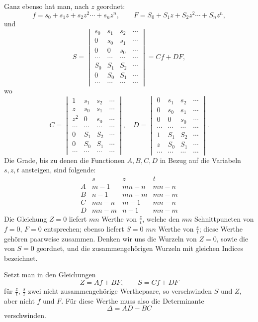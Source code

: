 \documentclass[10pt]{article}
\begin{document}
Ganz ebenso hat man, nach $z$ geordnet:
\[
f=s_0+s_1z+s_2z^2\cdots+s_nz^n,
\qquad
F=S_0+S_1z+S_2z^2\cdots+S_nz^n,
\]
und
\[
S=\begin{vmatrix}
s_0&s_1&s_2&\cdots\\
0&s_0&s_1&\cdots\\
0&0&s_0&\cdots\\
\cdots&\cdots&\cdots&\cdots\\
S_0&S_1&S_2&\cdots\\
0&S_0&S_1&\cdots\\
\cdots&\cdots&\cdots&\cdots
\end{vmatrix}=Cf+DF,
\]
wo
\[
C=\begin{vmatrix}
1&s_1&s_2&\cdots\\
z&s_0&s_1&\cdots\\
z^2&0&s_0&\cdots\\
\cdots&\cdots&\cdots&\cdots\\
0&S_1&S_2&\cdots\\
0&S_0&S_1&\cdots\\
\cdots&\cdots&\cdots&\cdots
\end{vmatrix},\quad
D=\begin{vmatrix}
0&s_1&s_2&\cdots\\
0&s_0&s_1&\cdots\\
0&0&s_0&\cdots\\
\cdots&\cdots&\cdots&\cdots\\
1&S_1&S_2&\cdots\\
z&S_0&S_1&\cdots\\
\cdots&\cdots&\cdots&\cdots
\end{vmatrix}.
\]
Die Grade, bis zu denen die Functionen $A,B,C,D$ in Bezug auf die Variabeln $s,z,t$ ansteigen, sind folgende:
\[
\begin{array}{c|ccc}
& s&z&t\\ \hline
A&m-1&mn-n&mn-n\\
B&n-1&mn-m&mn-m\\
C&mn-n&m-1&mn-n\\
D&mn-m&n-1&mn-m
\end{array}
\]
Die Gleichung $Z=0$ liefert $mn$ Werthe von $\frac{z}{t}$, welche den $mn$ Schnittpuncten von $f=0$, $F=0$ entsprechen; ebenso liefert $S=0$ $mn$ Werthe von $\frac{s}{t}$; diese Werthe gehören paarweise zusammen. Denken wir uns die Wurzeln von $Z=0$, sowie die von $S=0$ geordnet, und die zusammengehörigen Wurzeln mit gleichen Indices bezeichnet.

Setzt man in den Gleichungen
\[
Z=Af+BF,
\qquad
S=Cf+DF
\]
für $\frac{z}{t}$, $\frac{s}{t}$ zwei nicht zusammengehörige Werthepaare, so verschwinden $S$ und $Z$, aber nicht $f$ und $F$. Für diese Werthe muss also die Determinante
\[
\Delta=AD-BC
\]
verschwinden.
\end{document}
